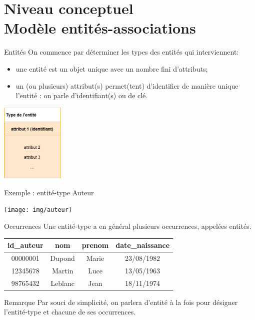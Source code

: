 \documentclass[10pt]{beamer}
\begin{document}
\section{Niveau conceptuel\\ Modèle entités-associations}
\begin{frame}{Entités}
On commence par déterminer les types des entités qui interviennent:\pause
\begin{itemize}
	\item	une \alert{entité} est un objet unique avec un nombre fini d'attributs;\pause
	\item	un (ou plusieurs) attribut(s) permet(tent) d'identifier de manière unique l'entité : on parle d'\alert{identifian}t(s) ou de clé.\pause
\end{itemize}
\begin{center}
\includegraphics[width=3cm]{img/entité}
\end{center}
\end{frame}
\begin{frame}{Exemple : entité-type Auteur}
\begin{center}
\texttt{[image: img/auteur]}
\end{center}
\end{frame}
\begin{frame}{Occurrences}
	Une entité-type a en général plusieurs occurrences, appelées entités.\\\pause

    \begin{center}
        \begin{tabular}{cccc}
        \hline
        \rowcolor{beamerRed!25}
        \textbf{id\_auteur }& \textbf{nom} & \textbf{prenom}&\textbf{date\_naissance}\\\hline
        \rowcolor{beamerBlue!7}00000001 & Dupond & Marie& 23/08/1982\\
        \rowcolor{beamerRed!7}12345678 & Martin & Luce& 13/05/1963\\
        \rowcolor{beamerBlue!7}98765432 & Leblanc & Jean& 18/11/1974\\
         \hline
        \end{tabular}
    \end{center}\pause
    \begin{alertblock}{Remarque}
    	Par souci de simplicité, on parlera d'entité à la fois pour désigner l'entité-type et chacune de ses occurrences.
    \end{alertblock}
\end{frame}
\end{document}
